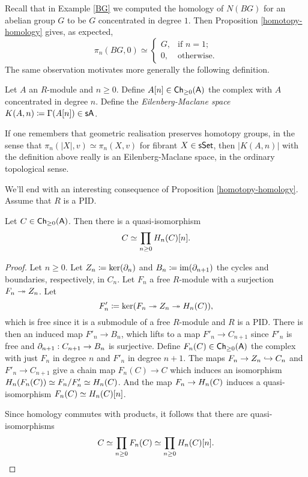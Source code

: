 \begin{remark}
  Recall that in Example \ref{BG} we computed the homology of $N(BG)$
  for an abelian group $G$ to be $G$ concentrated in degree $1$. Then
  Proposition \ref{homotopy-homology} gives, as expected,
  \[
  \pi_n(BG,0) \simeq
  \begin{cases}
    G, & \text{if } n = 1; \\
    0, & \text{otherwise}.
  \end{cases}
  \]
  The same observation motivates more generally the following
  definition.
\end{remark}

\begin{definition}
  Let $A$ an $R$-module and $n \ge 0$. Define $A[n] \in \mathsf{Ch}_{\ge
    0}(\mathsf{A})$ the complex with $A$ concentrated in degree $n$. Define
  the \textit{Eilenberg-Maclane space} $K(A,n) \coloneqq \Gamma(A[n])
  \in \mathsf{s}\mathsf{A}$.
\end{definition}

\begin{remark}
  If one remembers that geometric realisation preserves homotopy
  groups, in the sense that $\pi_n(|X|,v) \simeq \pi_n(X,v)$ for
  fibrant $X \in \mathsf{s}\mathsf{Set}$, then $|K(A,n)|$ with the definition above
  really is an Eilenberg-Maclane space, in the ordinary topological
  sense.
\end{remark}

We'll end with an interesting consequence of Proposition
\ref{homotopy-homology}. Assume that $R$ is a PID.

\begin{lemma}
  \label{quasi-homology}
  Let $C \in \mathsf{Ch}_{\ge 0}(\mathsf{A})$. Then there is a quasi-isomorphism
  \[
  C \simeq \prod_{n \ge 0} H_n(C)[n].
  \]
\end{lemma}

\begin{proof}
  Let $n \ge 0$. Let $Z_n \coloneqq \ker(\partial_n)$ and $B_n \coloneqq
  \operatorname{im}(\partial_{n+1})$ the cycles and boundaries, respectively, in
  $C_n$. Let $F_n$ a free $R$-module with a surjection $F_n \twoheadrightarrow
  Z_n$. Let
  \[
  F'_n \coloneqq \ker(F_n \twoheadrightarrow Z_n \twoheadrightarrow H_n(C)),
  \]
  which is free since it is a submodule of a free $R$-module and $R$
  is a PID. There is then an induced map $F'_n \to B_n$, which lifts
  to a map $F'_n \to C_{n+1}$ since $F'_n$ is free and $\partial_{n+1} :
  C_{n+1} \to B_n$ is surjective. Define $F_n(C) \in \mathsf{Ch}_{\ge 0}(\mathsf{A})$
  the complex with just $F_n$ in degree $n$ and $F'_n$ in degree
  $n+1$. The maps $F_n \to Z_n \hookrightarrow C_n$ and $F'_n \to C_{n+1}$ give a
  chain map $F_n(C) \to C$ which induces an isomorphism $H_n(F_n(C))
  \simeq F_n/F'_n \simeq H_n(C)$. And the map $F_n \to H_n(C)$
  induces a quasi-isomorphism $F_n(C) \simeq H_n(C)[n]$.

  Since homology commutes with products, it follows that there are
  quasi-isomorphisms
  \[
  C \simeq \prod_{n \ge 0} F_n(C) \simeq \prod_{n \ge 0}
  H_n(C)[n]. \qedhere
  \]
\end{proof}


